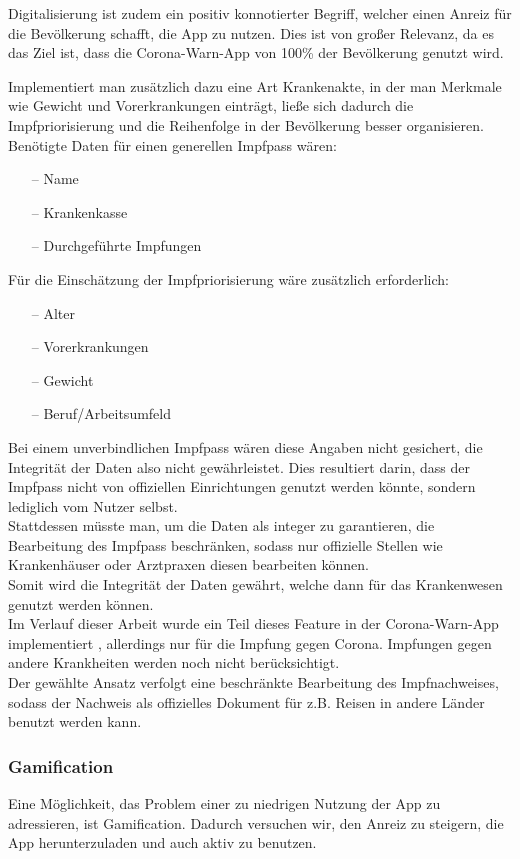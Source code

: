 \documentclass[conference,compsoc]{IEEEtran}
\begin{document}
Digitalisierung ist zudem ein positiv konnotierter Begriff, welcher einen Anreiz für die Bevölkerung schafft, die App zu nutzen. 
Dies ist von großer Relevanz, da es das Ziel ist, dass die Corona-Warn-App von 100\% der Bevölkerung genutzt wird.

Implementiert man zusätzlich dazu eine Art Krankenakte, in der man Merkmale wie Gewicht und Vorerkrankungen einträgt, ließe sich dadurch die Impfpriorisierung und die Reihenfolge in der Bevölkerung besser organisieren.
Benötigte Daten für einen generellen Impfpass wären:
\begin{itemize}
	\item[--]Name
	\item[--]Krankenkasse
	\item[--]Durchgeführte Impfungen
\end{itemize} 
Für die Einschätzung der Impfpriorisierung wäre zusätzlich erforderlich:
\begin{itemize}
	\item[--]Alter
	\item[--]Vorerkrankungen
	\item[--]Gewicht 
	\item[--]Beruf/Arbeitsumfeld
\end{itemize} 
Bei einem unverbindlichen Impfpass wären diese Angaben nicht gesichert, die Integrität der Daten also nicht gewährleistet. Dies resultiert darin, dass der Impfpass nicht von offiziellen Einrichtungen genutzt werden könnte, sondern lediglich vom Nutzer selbst.\\
Stattdessen müsste man, um die Daten als integer zu garantieren, die Bearbeitung des Impfpass beschränken, sodass nur offizielle Stellen wie Krankenhäuser oder Arztpraxen diesen bearbeiten können.\\
Somit wird die Integrität der Daten gewährt, welche dann für das Krankenwesen genutzt werden können.\\
Im Verlauf dieser Arbeit wurde ein Teil dieses Feature in der Corona-Warn-App implementiert \cite{Impfnachweis}, allerdings nur für die Impfung gegen Corona. Impfungen gegen andere Krankheiten werden noch nicht berücksichtigt.\\
Der gewählte Ansatz verfolgt eine beschränkte Bearbeitung des Impfnachweises, sodass der Nachweis als offizielles Dokument für z.B. Reisen in andere Länder benutzt werden kann.\\ 


\subsubsection{Gamification}
Eine Möglichkeit, das Problem einer zu niedrigen Nutzung der App zu adressieren, ist Gamification. Dadurch versuchen wir, den Anreiz zu steigern, die App herunterzuladen und auch aktiv zu benutzen.
\end{document}
